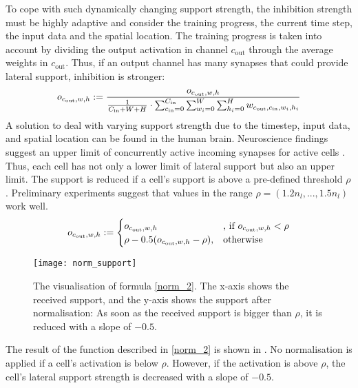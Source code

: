 To cope with such dynamically changing support strength, the inhibition strength must be highly adaptive and consider the training progress, the current time step, the input data and the spatial location. 
The training progress is taken into account by dividing the output activation in channel $c_{\text{out}}$ through the average weights in $c_{\text{out}}$. Thus, if an output channel has many synapses that could provide lateral support, inhibition is stronger:
%
\begin{align}\eqlbl{norm_1}
    o_{c_{\text{out}},w,h} := \frac{o_{c_{\text{out}},w,h}}{\frac{1}{C_{\text{in}} + W + H} \cdot \sum_{c_{\text{in}}=0}^{C_{\text{in}}} \sum_{w_i=0}^{W} \sum_{h_i=0}^{H} w_{c_{\text{out}}, c_{\text{in}},w_i,h_i}}
\end{align}
%
A solution to deal with varying support strength due to the timestep, input data, and spatial location can be found in the human brain.
Neuroscience findings suggest an upper limit of concurrently active incoming synapses for active cells . Thus, each cell has not only a lower limit of lateral support but also an upper limit.
The support is reduced if a cell's support is above a pre-defined threshold $\rho$.
Preliminary experiments suggest that values in the range $\rho = (1.2n_l, ..., 1.5n_l)$ work well.
%
\begin{align}\eqlbl{norm_2}
	o_{c_{\text{out}},w,h} := \begin{cases}
      		o_{c_{\text{out}},w,h} & \text{, if } o_{c_{\text{out}},w,h} < \rho \\
      		\rho - 0.5(o_{c_{\text{out}},w,h} - \rho), & \text{otherwise}
    	\end{cases}
\end{align}
%
\begin{figure}[h]
    \centering
    \texttt{[image: norm\_support]}
    \caption[Inhibition for too many activated cells]{The visualisation of formula \eqref{norm_2}. The x-axis shows the received support, and the y-axis shows the support after normalisation: As soon as the received support is bigger than $\rho$, it is reduced with a slope of $-0.5$.}
\end{figure}
The result of the function described in \eqref{norm_2} is shown in . No normalisation is applied if a cell's activation is below $\rho$. However, if the activation is above $\rho$, the cell's lateral support strength is decreased with a slope of $-0.5$.


